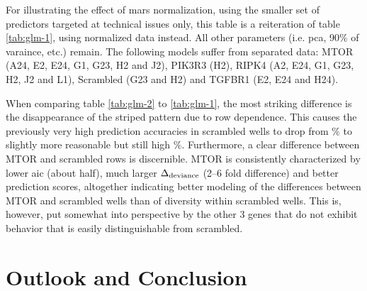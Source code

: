 \renewcommand{\arraystretch}{1.5}
\setlength{\tabcolsep}{0.25em}
\begin{table}
  \centering
  \caption[Reiteration of table \ref{tab:glm-1}, using normalized features for \gls{glm} fitting.]{For illustrating the effect of \gls{mars} normalization, using the smaller set of predictors targeted at technical issues only, this table is a reiteration of table \ref{tab:glm-1}, using normalized data instead. All other parameters (i.e. \gls{pca}, 90\% of varaince, etc.) remain. The following models suffer from separated data: MTOR (A24, E2, E24, G1, G23, H2 and J2), PIK3R3 (H2), RIPK4 (A2, E24, G1, G23, H2, J2 and L1), Scrambled (G23 and H2) and TGFBR1 (E2, E24 and H24).}
  \label{tab:glm-2}
  \footnotesize
  \vspace{5px}
  
\end{table}

When comparing table \ref{tab:glm-2} to  \ref{tab:glm-1}, the most striking difference is the disappearance of the striped pattern due to row dependence. This causes the previously very high prediction accuracies in scrambled wells to drop from \% to slightly more reasonable but still high \%. Furthermore, a clear difference between MTOR and scrambled rows is discernible. MTOR is consistently characterized by lower \gls{aic} (about half), much larger $\Delta\textsubscript{deviance}$ (2--6 fold difference) and better prediction scores, altogether indicating better modeling of the differences between MTOR and scrambled wells than of diversity within scrambled wells. This is, however, put somewhat into perspective by the other 3 genes that do not exhibit behavior that is easily distinguishable from scrambled.

\section{Outlook and Conclusion}
